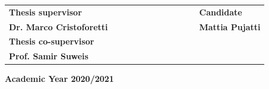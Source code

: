 \documentclass[../main.tex]{subfiles}
\begin{document}
\begin{titlepage}
		\vspace{20mm}
		\begin{spacing}{2}
			\begin{tabular}{ l  c  c c c  cc c c c c  l }
				{\Large{\bf Thesis supervisor}} &&&&&&&&&&& {\Large{\bf Candidate}}\\
				{\Large{\bf Dr. Marco Cristoforetti}} &&&&&&&&&&& {\Large{\bf Mattia Pujatti}}\\
				{\Large{\bf Thesis co-supervisor}}\\
				{\Large{\bf Prof. Samir Suweis}}\\
			\end{tabular}
		\end{spacing}
		\vspace{15 mm}
		
		\begin{center}
			{\Large{\bf Academic Year 2020/2021}}
		\end{center}
	\end{titlepage}
	\clearpage{\pagestyle{empty}\cleardoublepage}
	
	
\end{document}
